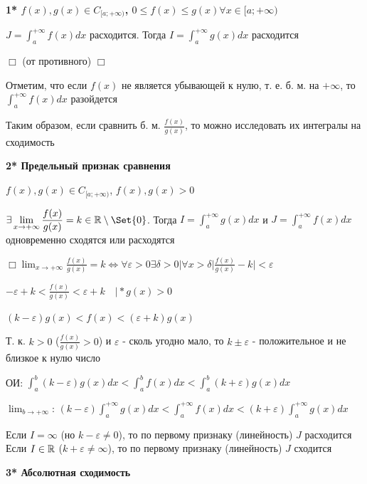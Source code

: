 \documentclass[12pt]{article}
\begin{document}
    \textbf{1* $f(x), g(x) \in C_{[a;+\infty)}$, $0 \leq f(x) \leq g(x) \forall x \in [a;+\infty)$}

    $\displaystyle J = \int^{+\infty}_{a} f(x) dx \text{  расходится. Тогда  } I = \int^{+\infty}_{a} g(x) dx \text{  расходится}$

    $\Box$ \Lab (от противного) $\Box$

    \Nota Отметим, что если $f(x)$ не является убывающей к нулю, т. е. б. м. на $+\infty$, то $\displaystyle \int^{+\infty}_{a} f(x) dx$ разойдется

    Таким образом, если сравнить б. м. $\displaystyle \frac{f(x)}{g(x)}$, то можно исследовать их интегралы на сходимость

    \hypertarget{improperintegralconvergenceinlimits}{}
    \textbf{2* Предельный признак сравнения}

    $f(x), g(x) \in C_{[a;+\infty)}$, $f(x), g(x) > 0$

    $\displaystyle \exists \lim_{x\to+\infty} \frac{f(x)}{g(x)} = k \in \Real \setminus \Set{0}$.
    Тогда $\displaystyle I = \int^{+\infty}_{a} g(x)dx$ и $\displaystyle J = \int^{+\infty}_{a} f(x)dx$ одновременно сходятся или расходятся

    $\displaystyle \Box \lim_{x\to+\infty} \frac{f(x)}{g(x)} = k \Longleftrightarrow \forall \varepsilon > 0 \exists \delta > 0 | \forall x > \delta |\frac{f(x)}{g(x)} - k| < \varepsilon $

    $\displaystyle -\varepsilon + k < \frac{f(x)}{g(x)} < \varepsilon + k \quad \Big| * g(x) > 0$

    $\displaystyle (k - \varepsilon)g(x) < f(x) < (\varepsilon + k)g(x)$

    Т. к. $k > 0$ ($\frac{f(x)}{g(x)} > 0$) и $\varepsilon$ - сколь угодно мало, то $k \pm \varepsilon$ - положительное и не близкое к нулю число

    ОИ: $\displaystyle \int^{b}_{a} (k - \varepsilon)g(x) dx < \int^{b}_{a} f(x) dx < \int^{b}_{a} (k + \varepsilon)g(x) dx$

    $\displaystyle \lim_{b \to +\infty}$: $\displaystyle (k - \varepsilon) \int^{+\infty}_{a} g(x) dx < \int^{+\infty}_{a} f(x) dx < (k + \varepsilon) \int^{+\infty}_{a} g(x) dx$

    Если $I = \infty$ (но $k - \varepsilon \neq 0$), то по первому признаку (линейность) $J$ расходится
    Если $I \in \mathbb{R}$ ($k + \varepsilon \neq \infty$), то по первому признаку (линейность) $J$ сходится

    \hypertarget{improperintegralabsoluteconvergence}{}
    \textbf{3* Абсолютная сходимость}
\end{document}

